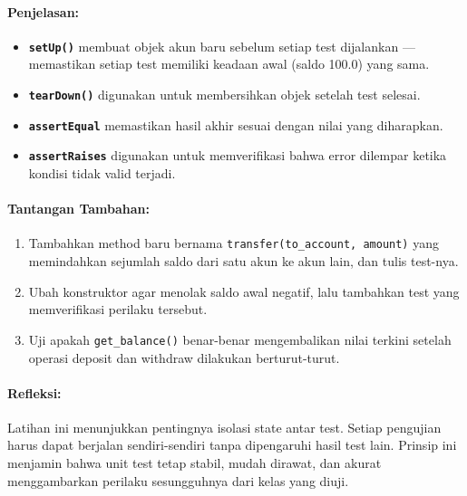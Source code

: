 \paragraph{Penjelasan:}
\begin{itemize}
    \item \textbf{\texttt{setUp()}} membuat objek akun baru sebelum setiap test dijalankan — memastikan setiap test memiliki keadaan awal (saldo 100.0) yang sama.
    \item \textbf{\texttt{tearDown()}} digunakan untuk membersihkan objek setelah test selesai.
    \item \textbf{\texttt{assertEqual}} memastikan hasil akhir sesuai dengan nilai yang diharapkan.
    \item \textbf{\texttt{assertRaises}} digunakan untuk memverifikasi bahwa error dilempar ketika kondisi tidak valid terjadi.
\end{itemize}

\paragraph{Tantangan Tambahan:}
\begin{enumerate}
    \item Tambahkan method baru bernama \texttt{transfer(to\_account, amount)} yang memindahkan sejumlah saldo dari satu akun ke akun lain, dan tulis test-nya.
    \item Ubah konstruktor agar menolak saldo awal negatif, lalu tambahkan test yang memverifikasi perilaku tersebut.
    \item Uji apakah \texttt{get\_balance()} benar-benar mengembalikan nilai terkini setelah operasi deposit dan withdraw dilakukan berturut-turut.
\end{enumerate}

\paragraph{Refleksi:}
Latihan ini menunjukkan pentingnya isolasi state antar test.  
Setiap pengujian harus dapat berjalan sendiri-sendiri tanpa dipengaruhi hasil test lain.  
Prinsip ini menjamin bahwa unit test tetap stabil, mudah dirawat, dan akurat menggambarkan perilaku sesungguhnya dari kelas yang diuji.
